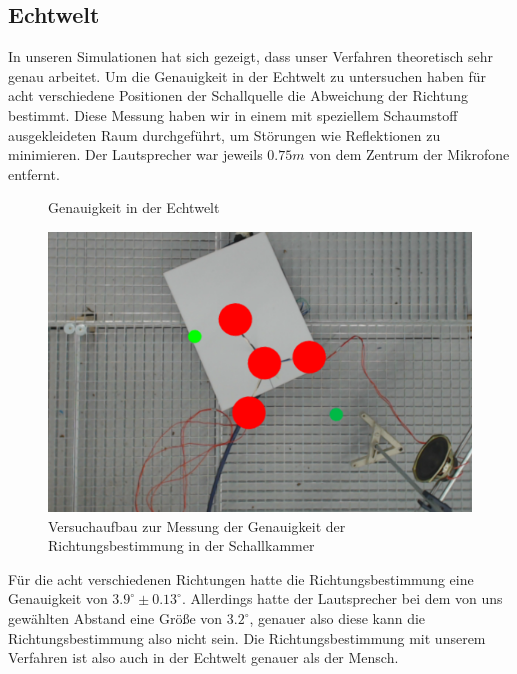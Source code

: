 \subsection{Echtwelt}
In unseren Simulationen hat sich gezeigt, dass unser Verfahren theoretisch sehr genau arbeitet. Um die Genauigkeit in der Echtwelt zu untersuchen haben für acht verschiedene Positionen der Schallquelle die Abweichung der Richtung bestimmt. Diese Messung haben wir in einem mit speziellem Schaumstoff~\cite{BASOTECT} ausgekleideten Raum durchgeführt, um Störungen wie Reflektionen zu minimieren. Der Lautsprecher war jeweils $0.75m$ von dem Zentrum der Mikrofone entfernt.
\begin{minipage}{0.49\linewidth}
\begin{figure}[H]
  \centering
  \resizebox{!}{\textwidth}{}
  \caption{Genauigkeit in der Echtwelt}
  \label{fig:real}
\end{figure}
\end{minipage}%
\begin{minipage}{0.49\linewidth}
\begin{figure}[H]
  \centering
  \includegraphics[widht=\textwidth]{img/pos_1}
  \caption{Versuchaufbau zur Messung der Genauigkeit der Richtungsbestimmung in der Schallkammer}
  \label{fig:real_reral}
\end{figure}
\end{minipage}%
Für die acht verschiedenen Richtungen hatte die Richtungsbestimmung eine Genauigkeit von $3.9^\circ \pm 0.13^\circ$. Allerdings hatte der Lautsprecher bei dem von uns gewählten Abstand eine Größe von $3.2^\circ$, genauer also diese kann die Richtungsbestimmung also nicht sein. Die Richtungsbestimmung mit unserem Verfahren ist also auch in der Echtwelt genauer als der Mensch.

